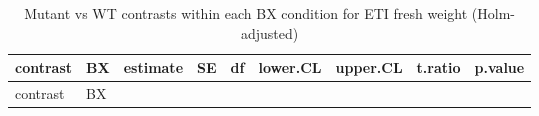 \documentclass[
  10pt,
]{article}
\begin{document}
\begin{longtable}[]{@{}
  >{\raggedright\arraybackslash}p{}
  >{\raggedright\arraybackslash}p{}
  >{\raggedleft\arraybackslash}p{}
  >{\raggedleft\arraybackslash}p{}
  >{\raggedleft\arraybackslash}p{}
  >{\raggedleft\arraybackslash}p{}
  >{\raggedleft\arraybackslash}p{}
  >{\raggedleft\arraybackslash}p{}
  >{\raggedleft\arraybackslash}p{}@{}}
\caption{Mutant vs WT contrasts within each BX condition for ETI fresh
weight (Holm-adjusted)}\tabularnewline
\toprule\noalign{}
\begin{minipage}[b]{\linewidth}\raggedright
contrast
\end{minipage} & \begin{minipage}[b]{\linewidth}\raggedright
BX
\end{minipage} & \begin{minipage}[b]{\linewidth}\raggedleft
estimate
\end{minipage} & \begin{minipage}[b]{\linewidth}\raggedleft
SE
\end{minipage} & \begin{minipage}[b]{\linewidth}\raggedleft
df
\end{minipage} & \begin{minipage}[b]{\linewidth}\raggedleft
lower.CL
\end{minipage} & \begin{minipage}[b]{\linewidth}\raggedleft
upper.CL
\end{minipage} & \begin{minipage}[b]{\linewidth}\raggedleft
t.ratio
\end{minipage} & \begin{minipage}[b]{\linewidth}\raggedleft
p.value
\end{minipage} \\
\midrule\noalign{}
\endfirsthead
\toprule\noalign{}
\begin{minipage}[b]{\linewidth}\raggedright
contrast
\end{minipage} & \begin{minipage}[b]{\linewidth}\raggedright
BX
\end{minipage} & \begin{minipage}[b]{\linewidth}\raggedleft

\end{minipage}
\end{longtable}
\end{document}
